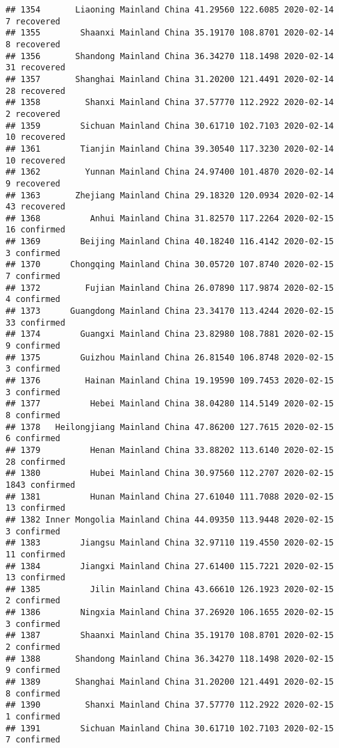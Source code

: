 \documentclass[
]{article}
\begin{document}
\begin{verbatim}
## 1354       Liaoning Mainland China 41.29560 122.6085 2020-02-14     7 recovered
## 1355        Shaanxi Mainland China 35.19170 108.8701 2020-02-14     8 recovered
## 1356       Shandong Mainland China 36.34270 118.1498 2020-02-14    31 recovered
## 1357       Shanghai Mainland China 31.20200 121.4491 2020-02-14    28 recovered
## 1358         Shanxi Mainland China 37.57770 112.2922 2020-02-14     2 recovered
## 1359        Sichuan Mainland China 30.61710 102.7103 2020-02-14    10 recovered
## 1361        Tianjin Mainland China 39.30540 117.3230 2020-02-14    10 recovered
## 1362         Yunnan Mainland China 24.97400 101.4870 2020-02-14     9 recovered
## 1363       Zhejiang Mainland China 29.18320 120.0934 2020-02-14    43 recovered
## 1368          Anhui Mainland China 31.82570 117.2264 2020-02-15    16 confirmed
## 1369        Beijing Mainland China 40.18240 116.4142 2020-02-15     3 confirmed
## 1370      Chongqing Mainland China 30.05720 107.8740 2020-02-15     7 confirmed
## 1372         Fujian Mainland China 26.07890 117.9874 2020-02-15     4 confirmed
## 1373      Guangdong Mainland China 23.34170 113.4244 2020-02-15    33 confirmed
## 1374        Guangxi Mainland China 23.82980 108.7881 2020-02-15     9 confirmed
## 1375        Guizhou Mainland China 26.81540 106.8748 2020-02-15     3 confirmed
## 1376         Hainan Mainland China 19.19590 109.7453 2020-02-15     3 confirmed
## 1377          Hebei Mainland China 38.04280 114.5149 2020-02-15     8 confirmed
## 1378   Heilongjiang Mainland China 47.86200 127.7615 2020-02-15     6 confirmed
## 1379          Henan Mainland China 33.88202 113.6140 2020-02-15    28 confirmed
## 1380          Hubei Mainland China 30.97560 112.2707 2020-02-15  1843 confirmed
## 1381          Hunan Mainland China 27.61040 111.7088 2020-02-15    13 confirmed
## 1382 Inner Mongolia Mainland China 44.09350 113.9448 2020-02-15     3 confirmed
## 1383        Jiangsu Mainland China 32.97110 119.4550 2020-02-15    11 confirmed
## 1384        Jiangxi Mainland China 27.61400 115.7221 2020-02-15    13 confirmed
## 1385          Jilin Mainland China 43.66610 126.1923 2020-02-15     2 confirmed
## 1386        Ningxia Mainland China 37.26920 106.1655 2020-02-15     3 confirmed
## 1387        Shaanxi Mainland China 35.19170 108.8701 2020-02-15     2 confirmed
## 1388       Shandong Mainland China 36.34270 118.1498 2020-02-15     9 confirmed
## 1389       Shanghai Mainland China 31.20200 121.4491 2020-02-15     8 confirmed
## 1390         Shanxi Mainland China 37.57770 112.2922 2020-02-15     1 confirmed
## 1391        Sichuan Mainland China 30.61710 102.7103 2020-02-15     7 confirmed

\end{verbatim}
\end{document}
